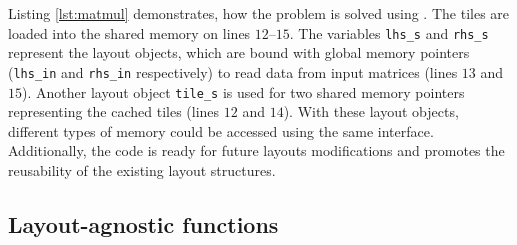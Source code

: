 

Listing \ref{lst:matmul} demonstrates, how the problem is solved using \Noarr{}. The tiles are loaded into the shared memory on lines $12$--$15$. The variables \texttt{lhs\_s} and \texttt{rhs\_s} represent the layout objects, which are bound with global memory pointers (\texttt{lhs\_in} and \texttt{rhs\_in} respectively) to read data from input matrices (lines $13$ and $15$). Another layout object \texttt{tile\_s} is used for two shared memory pointers representing the cached tiles (lines $12$ and $14$).
With these layout objects, different types of memory could be accessed using the same interface. Additionally, the code is ready for future layouts modifications and promotes the reusability of the existing layout structures.


\subsection{Layout-agnostic functions}\label{sec:layouts-agnostic}

